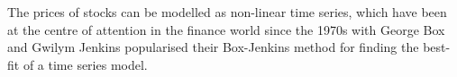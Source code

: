 The prices of stocks can be modelled as non-linear time series, which have been at the centre of attention in the finance world since the 1970s with George Box and Gwilym Jenkins popularised their Box-Jenkins method for finding the best-fit of a time series model.
